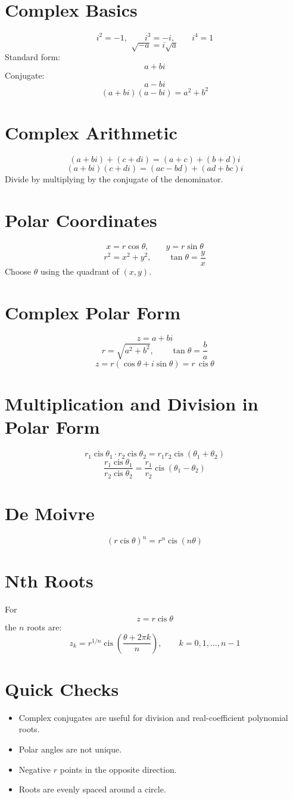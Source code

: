 \documentclass[11pt]{article}
\begin{document}

\section*{Complex Basics}
\[
i^2=-1,\qquad i^3=-i,\qquad i^4=1
\]
\[
\sqrt{-a}=i\sqrt a
\]
Standard form:
\[
a+bi
\]
Conjugate:
\[
a-bi
\]
\[
(a+bi)(a-bi)=a^2+b^2
\]

\section*{Complex Arithmetic}
\[
(a+bi)+(c+di)=(a+c)+(b+d)i
\]
\[
(a+bi)(c+di)=(ac-bd)+(ad+bc)i
\]
Divide by multiplying by the conjugate of the denominator.

\section*{Polar Coordinates}
\[
x=r\cos\theta,\qquad y=r\sin\theta
\]
\[
r^2=x^2+y^2,\qquad \tan\theta=\frac yx
\]
Choose $\theta$ using the quadrant of $(x,y)$.

\section*{Complex Polar Form}
\[
z=a+bi
\]
\[
r=\sqrt{a^2+b^2},\qquad \tan\theta=\frac ba
\]
\[
z=r(\cos\theta+i\sin\theta)=r\,\operatorname{cis}\theta
\]

\section*{Multiplication and Division in Polar Form}
\[
r_1\operatorname{cis}\theta_1\cdot r_2\operatorname{cis}\theta_2
=r_1r_2\operatorname{cis}(\theta_1+\theta_2)
\]
\[
\frac{r_1\operatorname{cis}\theta_1}{r_2\operatorname{cis}\theta_2}
=\frac{r_1}{r_2}\operatorname{cis}(\theta_1-\theta_2)
\]

\section*{De Moivre}
\[
\left(r\operatorname{cis}\theta\right)^n=r^n\operatorname{cis}(n\theta)
\]

\section*{Nth Roots}
For
\[
z=r\operatorname{cis}\theta
\]
the $n$ roots are:
\[
z_k=r^{1/n}\operatorname{cis}\left(\frac{\theta+2\pi k}{n}\right),
\qquad k=0,1,\dots,n-1
\]

\section*{Quick Checks}
\begin{itemize}
  \item Complex conjugates are useful for division and real-coefficient polynomial roots.
  \item Polar angles are not unique.
  \item Negative $r$ points in the opposite direction.
  \item Roots are evenly spaced around a circle.
\end{itemize}
\end{document}
